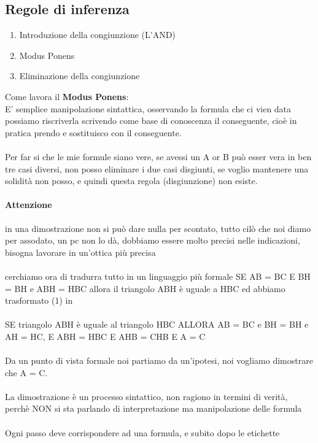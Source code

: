 \documentclass[12pt, a4paper, openany, oneside]{book}
\begin{document}
\subsection{Regole di inferenza}
\begin{enumerate}
	\item Introduzione della congiunzione (L'AND)
	\item Modus Ponens
	\item Eliminazione della congiunzione
\end{enumerate}
Come lavora il \textbf{Modus Ponens}: \\
E' semplice manipolazione sintattica, osservando la formula che ci vien data
possiamo riscriverla scrivendo come base di conoscenza il conseguente, 
cioè in pratica prendo e sostituisco con il conseguente.
\\ \\
Per far si che le mie formule siano vere, se avessi un A or B può esser vera in 
ben tre casi diversi, non posso eliminare i due casi disgiunti, se voglio 
mantenere una solidità non posso, e quindi questa regola (disgiunzione) non 
esiste.
\paragraph{Attenzione} in una dimostrazione non si può dare nulla per 
scontato, tutto cilò che noi diamo per assodato, un pc non lo dà, dobbiamo 
essere molto precisi nelle indicazioni, bisogna lavorare in un'ottica più 
precisa
\\ \\
cerchiamo ora di tradurra tutto in un linguaggio più formale
SE AB = BC E BH = BH e ABH = HBC allora il triangolo ABH è uguale a HBC 
ed abbiamo trasformato (1) in \\ \\
SE triangolo ABH è uguale al triangolo HBC ALLORA AB = BC e BH = BH e AH = HC,
E ABH = HBC E AHB = CHB E A = C
\\ \\
Da un punto di vista formale noi partiamo da un'ipotesi, noi vogliamo 
dimostrare che A = C.
\\ \\
La dimostrazione è un processo sintattico, non ragiono in termini di verità, 
perchè NON si sta parlando di interpretazione ma manipolazione delle formula
\\ \\
Ogni passo deve corrispondere ad una formula, e subito dopo le etichette
\end{document}

